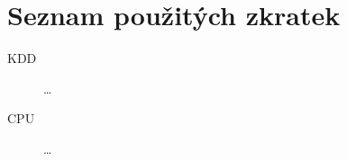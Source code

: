 \documentclass[thesis=M,czech]{FITthesis}[2012/06/26]
\begin{document}
\begin{conclusion}
\end{conclusion}




\appendix

\chapter{Seznam použitých zkratek}
\begin{description}
	\item[KDD] \dots
	\item[CPU] \dots
\end{description}


% 
% 
% 
% 
% 
\end{document}
